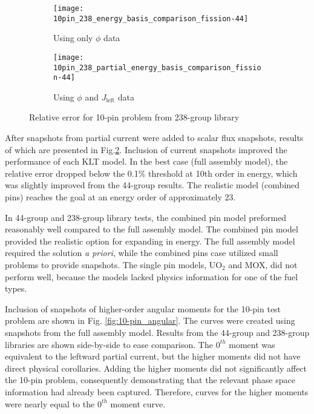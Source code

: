 \documentclass[5p,times,twocolumn,10pt]{elsarticle}
\begin{document}
  \begin{figure*}[!ht]
    \centering
    \begin{subfigure}{0.5\textwidth}
      \centering
      \texttt{[image: 10pin\_238\_energy\_basis\_comparison\_fission-44]}
      \caption{Using only $\phi$ data}
      \label{fig:10pin-238a}
    \end{subfigure}%
    \begin{subfigure}{0.5\textwidth}
      \centering
      \texttt{[image: 10pin\_238\_partial\_energy\_basis\_comparison\_fission-44]}
      \caption{Using $\phi$ and $J_{\text{left}}$ data}
      \label{fig:10pin-238b}
    \end{subfigure}
    \caption{Relative error for 10-pin problem from 238-group library}
    \label{fig:10pin-238}
  \end{figure*}
  
  After snapshots from partial current were added to scalar flux snapshots, results of which are presented in Fig.\ref{fig:10pin-238b}.
  Inclusion of current snapshots improved the performance of each KLT model.  In the best case (full assembly model), the relative error dropped below 
  the 0.1$\%$ threshold at 10th order in energy, which was slightly improved from the 44-group results. The realistic model (combined pins) reaches the goal at
  an energy order of approximately 23.  
  
  In 44-group and 238-group library tests, the combined pin model preformed reasonably well compared to the full assembly model.  The combined pin
  model provided the realistic option for expanding in energy.  The full assembly model required the solution {\it a priori}, while the combined pins case utilized
  small problems to provide snapshots.  The single pin models, UO$_2$ and MOX, did not perform well, because the models
  lacked physics information for one of the fuel types.
  
  Inclusion of snapshots of higher-order angular moments for the 10-pin test problem are shown in Fig. \ref{fig:10-pin_angular}.  The curves
  were created using snapshots from the full assembly model.  Results from the 44-group and 238-group libraries are shown side-by-side to ease
  comparison.  The $0^{th}$ moment was equivalent to the leftward partial
  current, but the higher moments did not have direct physical corollaries.  Adding the higher moments did not significantly affect the 
  10-pin problem, consequently demonstrating that the relevant phase space information had already been captured. Therefore, curves for the higher moments
  were nearly equal to the $0^{th}$ moment curve.
  
\end{document}
